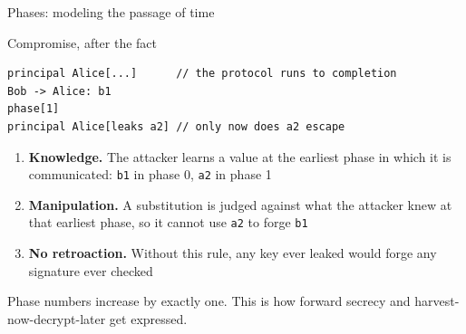 \ifdefined\PRESENTATION\else\PassOptionsToClass{handout}{beamer}\fi\documentclass[aspectratio=169, lualatex]{beamer}
\begin{document}
\begin{frame}[fragile]{Phases: modeling the passage of time}
	\begin{vpmodel}{Compromise, after the fact}
		\begin{lstlisting}
principal Alice[...]      // the protocol runs to completion
Bob -> Alice: b1
phase[1]
principal Alice[leaks a2] // only now does a2 escape
\end{lstlisting}
	\end{vpmodel}
	\vspace{0.3em}
	\small
	\begin{enumerate}
		\item \textbf{Knowledge.} The attacker learns a value at the earliest phase in which it is communicated: \texttt{b1} in phase 0, \texttt{a2} in phase 1
		\item \textbf{Manipulation.} A substitution is judged against what the attacker knew at that earliest phase, so it cannot use \texttt{a2} to forge \texttt{b1}
		\item \textbf{No retroaction.} Without this rule, any key ever leaked would forge any signature ever checked
	\end{enumerate}
	\begin{center}
		\small Phase numbers increase by exactly one. This is how forward secrecy and harvest-now-decrypt-later get expressed.
	\end{center}
\end{frame}
\end{document}

